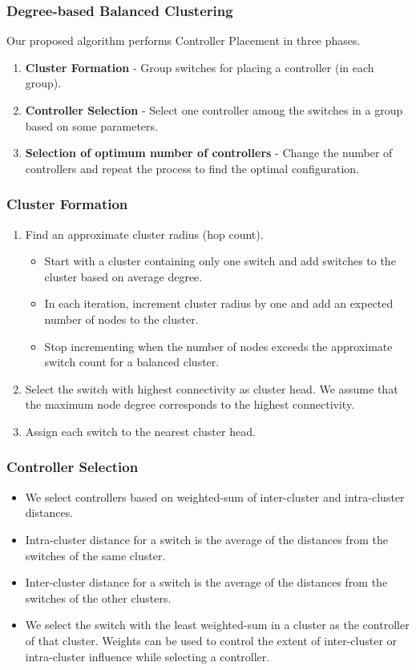 \documentclass{beamer}
\begin{document}
\begin{frame}
\frametitle{Degree-based Balanced Clustering}
Our proposed algorithm performs Controller Placement in three phases.
\begin{enumerate}
	\item \textbf{Cluster Formation} - Group switches for placing a controller (in each group).
	\item \textbf{Controller Selection} - Select one controller among the switches in a group based on some parameters.
	\item \textbf{Selection of optimum number of controllers} - Change the number of controllers and repeat the process to find the optimal configuration.
\end{enumerate}
\end{frame}
\begin{frame}
\frametitle{Cluster Formation}
\begin{enumerate}
	\item Find an approximate cluster radius (hop count).
	\begin{itemize}
		\item Start with a cluster containing only one switch and add switches to the cluster based on average degree.
		\item In each iteration, increment cluster radius by one and add an expected number of nodes to the cluster.
		\item Stop incrementing when the number of nodes exceeds the approximate switch count for a balanced cluster.
	\end{itemize}
	\item Select the switch with highest connectivity as cluster head. We assume that the maximum node degree corresponds to the highest connectivity.
	\item Assign each switch to the nearest cluster head.
\end{enumerate}
\end{frame}

\begin{frame}
\frametitle{Controller Selection}
\begin{itemize}
	\item We select controllers based on weighted-sum of inter-cluster and intra-cluster distances.
	\item Intra-cluster distance for a switch is the average of the distances from the switches of the same cluster.
	\item Inter-cluster distance for a switch is the average of the distances from the switches of the other clusters.
	\item We select the switch with the least weighted-sum in a cluster as the controller of that cluster. Weights can be used to control the extent of inter-cluster or intra-cluster influence while selecting a controller.
\end{itemize}
\end{frame}
\end{document}
